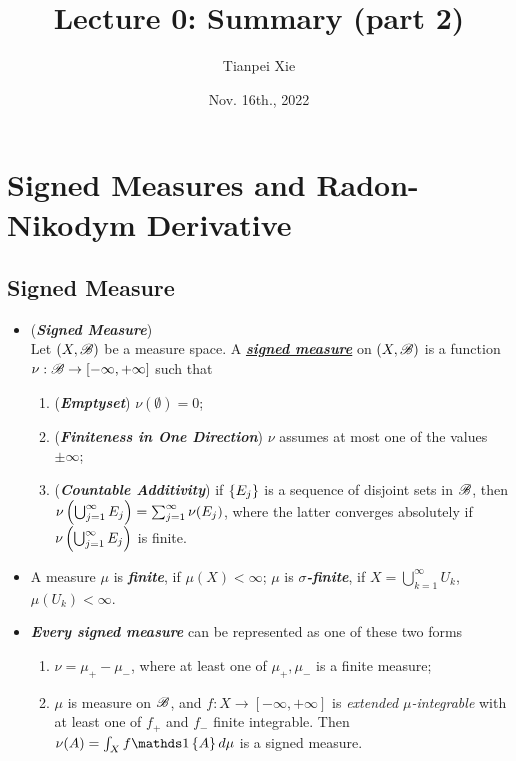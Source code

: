 \documentclass[11pt]{article}
\begin{document}
\title{Lecture 0:  Summary (part 2)}
\author{ Tianpei Xie}
\date{ Nov. 16th., 2022 }
\maketitle
\tableofcontents
\newpage
\section{Signed Measures and Radon-Nikodym Derivative}
\subsection{Signed Measure}
\begin{itemize}
\item \begin{definition} (\emph{\textbf{Signed Measure}})\\
Let $(X, {\mathscr B})$ be a measure space. A \underline{\emph{\textbf{signed measure}}} on $(X, {\mathscr B})$ is a function $\nu: {\mathscr B} \rightarrow [-\infty, +\infty]$ such that 
\begin{enumerate}
\item (\emph{\textbf{Emptyset}}) $\nu(\emptyset)= 0$;
\item (\emph{\textbf{Finiteness in One Direction}}) $\nu$ assumes at most one of the values $\pm \infty$;
\item (\emph{\textbf{Countable Additivity}}) if $\left\{E_{j}\right\}$ is a sequence of disjoint sets in ${\mathscr B}$, then $\nu\left(\bigcup_{j=1}^{\infty}E_{j}\right)= \sum_{j=1}^{\infty}\nu(E_{j})$, where the latter converges absolutely if $\nu\left(\bigcup_{j=1}^{\infty}E_{j}\right)$ is finite.
\end{enumerate} 
\end{definition}

\item \begin{definition}
A measure $\mu$ is \emph{\textbf{finite}}, if $\mu(X)<\infty$; $\mu$ is \emph{\textbf{$\sigma$-finite}}, if $X= \bigcup_{k=1}^{\infty}U_{k}$, $\mu(U_k)<\infty$. 
\end{definition}

\item \begin{remark}
\emph{\textbf{Every  signed measure}} can be represented as one of these two forms 
\begin{enumerate}
\item $\nu = \mu_{+}- \mu_{-}$, where at least one of $\mu_{+}, \mu_{-}$ is a finite measure;
\item $\mu$ is measure on ${\mathscr B}$, and $f: X \rightarrow [-\infty, +\infty]$ is \emph{extended $\mu$-integrable} with at least one of $f_{+}$ and $f_{-}$ finite integrable. Then $\nu(A) = \int_{X}f\ind{A} d\mu $ is a signed measure.
\end{enumerate}
\end{remark}


\end{itemize}
\end{document}
